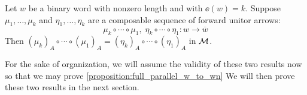 \begin{proposition}\label{proposition:unitor_chain_equivalence}
    Let $w$ be a binary word with nonzero length and with $\ee(w) = k$. 
    Suppose $\mu_1, \dots, \mu_k$ and $\eta_1, \dots, \eta_k$ are a 
    composable sequence of forward 
    unitor arrows:
    \[
        \mu_k \circ \cdots \circ \mu_1, \; \eta_k \circ \cdots \circ \eta_1: w \to \overline{w}
    \]
    Then $(\mu_k)_A \circ \cdots \circ (\mu_1)_A =  (\eta_k)_A \circ \cdots \circ (\eta_1)_A$
    in $\mathcal{M}$.
\end{proposition}

For the sake of organization, we will assume the validity of these two 
results now so that we may prove \ref{proposition:full_parallel_w_to_wn} 
We will then prove these two results in the next section.


